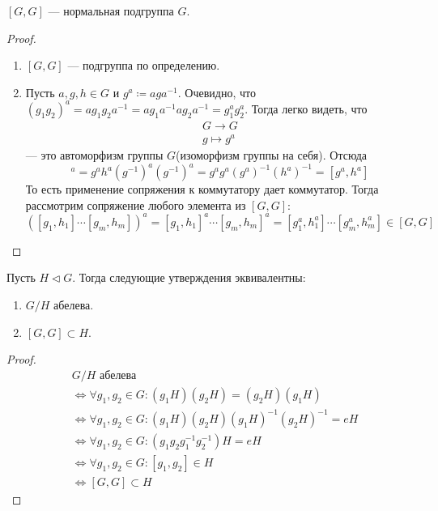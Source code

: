 \documentclass[../main.tex]{subfiles}
\begin{document}
\begin{theorem-non}
\label{non:6.18}
  $[G, G]$ --- нормальная подгруппа $G$.
\end{theorem-non}
\begin{proof}
  \begin{enumerate}
    \item $[G, G]$ --- подгруппа по определению.
    \item Пусть $a, g, h \in G$ и $g^a \coloneqq aga^{-1}$. Очевидно, что $(g_1g_2)^a = ag_1g_2a^{-1} = ag_1a^{-1}ag_2a^{-1} = g_1^ag_2^a$. Тогда легко видеть, что
    \begin{equation*}
      \begin{gathered}
        G \longrightarrow G\\
        g \mapsto g^a
      \end{gathered}
    \end{equation*}
    --- это автоморфизм группы $G$(изоморфизм группы на себя). Отсюда
    \begin{equation*}
      [g, h]^a = g^ah^a(g^{-1})^a(g^{-1})^a =
      g^ag^a(g^a)^{-1}(h^a)^{-1} = [g^a, h^a]
    \end{equation*}
    То есть применение сопряжения к коммутатору дает коммутатор. Тогда рассмотрим сопряжение любого элемента из $[G, G]$:
    \begin{equation*}
      ([g_1, h_1] \dotsm [g_m, h_m])^a
      =
      [g_1,h_1]^a \dotsm [g_m, h_m]^a
      =
      [g_1^a, h_1^a] \dotsm [g_m^a, h_m^a]
      \in [G, G]
    \end{equation*}
  \end{enumerate}
\end{proof}

\begin{theorem-non}
\label{non:6.19}
  Пусть $H \triangleleft G$. Тогда следующие утверждения эквивалентны:
  \begin{enumerate}
    \item $G/H$ абелева.
    \item $[G, G] \subset H$.
  \end{enumerate}
\end{theorem-non}
\begin{proof}
  \begin{align*}
    &G/H\text{ абелева } \\
    &\iff
    \forall g_1, g_2 \in G\colon (g_1H)(g_2H) = (g_2H)(g_1H) \\
    &\iff
    \forall g_1, g_2 \in G\colon (g_1H)(g_2H)(g_1H)^{-1}(g_2H)^{-1} = eH \\
    &\iff
    \forall g_1, g_2 \in G\colon (g_1g_2g_1^{-1}g_2^{-1})H = eH \\
    &\iff
    \forall g_1, g_2 \in G\colon [g_1, g_2] \in H \\
    &\iff
    [G, G] \subset H
  \end{align*}
\end{proof}
\end{document}
